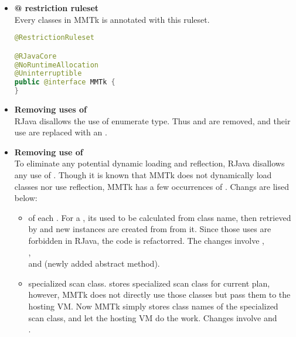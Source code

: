\documentclass[12pt]{article}
\begin{document}
\begin{itemize}
\item 
\textbf{@ restriction ruleset\\}
Every classes in MMTk is annotated with this ruleset. 
\begin{lstlisting}[language=java]
@RestrictionRuleset

@RJavaCore
@NoRuntimeAllocation
@Uninterruptible
public @interface MMTk {
}
\end{lstlisting}

\item 
\textbf{Removing uses of \\}
RJava disallows the use of enumerate type. 
Thus  and
 are removed,
and their use are replaced with an . 

\item
\textbf{Removing use of \\}
To eliminate any potential dynamic loading and reflection, 
RJava disallows any use of . 
Though it is known that MMTk does not dynamically load
classes nor use reflection, MMTk has a few occurrences
of . Changs are lised below:
  \begin{itemize}
  \item {} of each . 
  For a , its  used to be
  calculated from class name, then retrieved by 
  and new instances are created from from it. Since
  those uses are forbidden in RJava, the code is refactorred. 
  The changes involve ,\\
  ,
  \\and {} (newly
  added abstract method). 
  
  \item specialized scan class. 
   stores specialized scan
  class for current plan, however, MMTk does not directly use those
  classes but pass them to the hosting VM. Now MMTk simply stores
  class names of the specialized scan class, and let the hosting VM
  do the  work. Changes involve
   and \\
  . 
  

\end{itemize}
\end{itemize}
\end{document}
